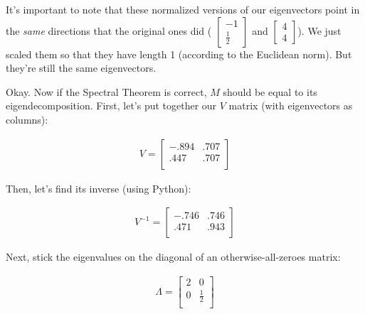 It's important to note that these normalized versions of our eigenvectors point
in the \textit{same} directions that the original ones did ({\footnotesize
$\begin{bmatrix} -1 \\ \frac{1}{2} \end{bmatrix}$} and {\footnotesize
$\begin{bmatrix} 4 \\ 4 \end{bmatrix}$}). We just scaled them so that they have
length 1 (according to the Euclidean norm). But they're still the same
eigenvectors.

\medskip

Okay. Now if the Spectral Theorem is correct, $M$ should be equal to its
eigendecomposition. First, let's put together our $V$ matrix (with eigenvectors
as columns):

\vspace{-.15in}
\begin{align*}
V =
\begin{bmatrix}
-.894 & .707 \\
.447 & .707 \\
\end{bmatrix}
\end{align*}
\vspace{-.15in}

Then, let's find its inverse (using Python):

\vspace{-.15in}
\begin{align*}
V^{-1} =
\begin{bmatrix}
-.746 & .746 \\
.471 & .943 \\
\end{bmatrix}
\end{align*}
\vspace{-.15in}

Next, stick the eigenvalues on the diagonal of an otherwise-all-zeroes matrix:

\vspace{-.15in}
\begin{align*}
\Lambda =
\begin{bmatrix}
2 & 0 \\
0 & \frac{1}{2} \\
\end{bmatrix}
\end{align*}
\vspace{-.15in}

